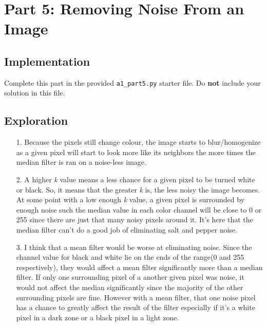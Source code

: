 \documentclass[fontsize=11pt]{article}
\begin{document}
    \newpage

    \section*{Part 5: Removing Noise From an Image}

    \subsection*{Implementation}

    Complete this part in the provided \texttt{a1\_part5.py} starter file.
    Do \textbf{not} include your solution in this file.

    \subsection*{Exploration}

    \begin{enumerate}
        \item[1.] Because the pixels still change colour, the image starts to blur/homogenize as a given pixel will start to look more like its neighbors the more times the median filter is ran on a noise-less image.
        \item[2.] A higher \emph{k} value means a less chance for a given pixel to be turned white or black. So, it means that the greater \emph{k} is, the less noisy the image becomes. At some point with a low enough \emph{k} value, a given pixel is surrounded by enough noise such the median value in each color channel will be close to 0 or 255 since there are just that many noisy pixels around it. It's here that the median filter can't do a good job of eliminating salt and pepper noise.
        \item[3.] I think that a mean filter would be worse at eliminating noise. Since the channel value for black and white lie on the ends of the range(0 and 255 respectively), they would affect a mean filter significantly more than a median filter. If only one surrounding pixel of a another given pixel was noise, it would not affect the median significantly since the majority of the other surrounding pixels are fine. However with a mean filter, that one noise pixel has a chance to greatly affect the result of the filter especially if it's a white pixel in a dark zone or a black pixel in a light zone.
    \end{enumerate}
\end{document}

